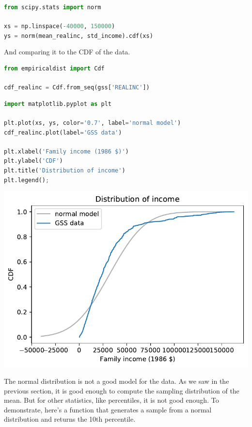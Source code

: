 \begin{lstlisting}[language=Python]
from scipy.stats import norm

xs = np.linspace(-40000, 150000)
ys = norm(mean_realinc, std_income).cdf(xs)
\end{lstlisting}

And comparing it to the CDF of the data.

\begin{lstlisting}[language=Python]
from empiricaldist import Cdf

cdf_realinc = Cdf.from_seq(gss['REALINC'])
\end{lstlisting}

\begin{lstlisting}[language=Python]
import matplotlib.pyplot as plt

plt.plot(xs, ys, color='0.7', label='normal model')
cdf_realinc.plot(label='GSS data')

plt.xlabel('Family income (1986 $)')
plt.ylabel('CDF')
plt.title('Distribution of income')
plt.legend();
\end{lstlisting}

\begin{center}
\includegraphics[scale=0.75]{chapters/12_bootstrap_files/12_bootstrap_29_0.pdf}
\end{center}

The normal distribution is not a good model for the data. As we saw in
the previous section, it is good enough to compute the sampling
distribution of the mean. But for other statistics, like percentiles, it
is not good enough. To demonstrate, here's a function that generates a
sample from a normal distribution and returns the 10th percentile.


